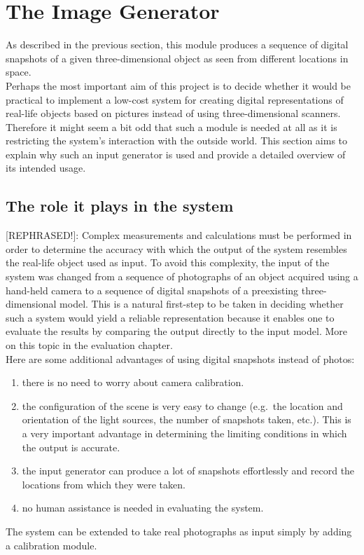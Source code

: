 \documentclass[12pt,a4paper,twoside,openright]{report}
\begin{document}
\section{The Image Generator}
As described in the previous section, this module produces a sequence of digital snapshots of a given three-dimensional object as seen from different locations in space. \\
Perhaps the most important aim of this project is to decide whether it would be practical to implement a low-cost system for creating digital representations of real-life objects based on pictures instead of using three-dimensional scanners. Therefore it might seem a bit odd that such a module is needed at all as it is restricting the system's interaction with the outside world. This section aims to explain why such an input generator is used and provide a detailed overview of its intended usage. 
\subsection{The role it plays in the system}
[REPHRASED!]: Complex measurements and calculations must be performed in order to determine the accuracy with which the output of the system resembles the real-life object used as input. To avoid this complexity, the input of the system was changed from a sequence of photographs of an object acquired using a hand-held camera to a sequence of digital snapshots of a preexisting three-dimensional model. This is a natural first-step to be taken in deciding whether such a system would yield a reliable representation because it enables one to evaluate the results by comparing the output directly to the input model. More on this topic in the evaluation chapter.\\
Here are some additional advantages of using digital snapshots instead of photos: 
\begin{enumerate}
\item there is no need to worry about camera calibration.
\item the configuration of the scene is very easy to change (e.g.\ the location and orientation of the light sources, the number of snapshots taken, etc.). This is a very important advantage in determining the limiting conditions in which the output is accurate.
\item the input generator can produce a lot of snapshots effortlessly and record the locations from which they were taken.
\item no human assistance is needed in evaluating the system.
\end{enumerate}
The system can be extended to take real photographs as input simply by adding a calibration module.
\end{document}
